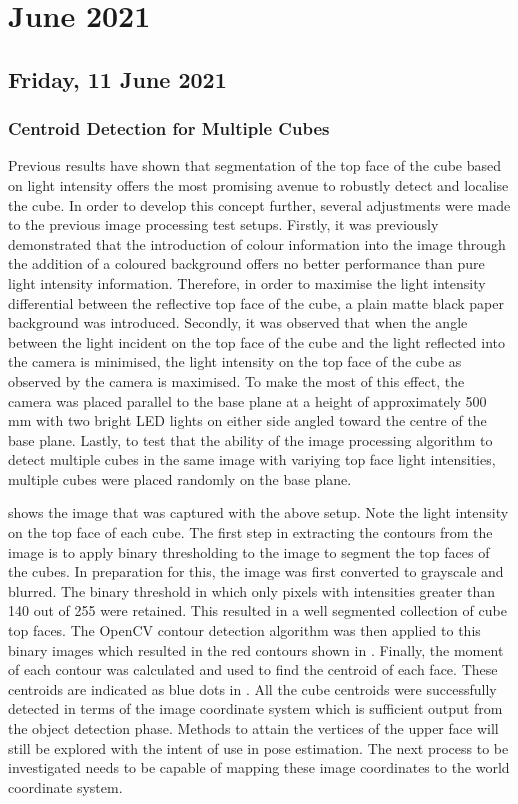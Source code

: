 \chapter[2021 June]{June 2021}

\section[2021/06/11]{Friday, 11 June 2021}

\subsection{Centroid Detection for Multiple Cubes}

Previous results have shown that segmentation of the top face of the cube based on light intensity offers the most promising avenue to robustly detect and localise the cube. In order to develop this concept further, several adjustments were made to the previous image processing test setups. Firstly, it was previously demonstrated that the introduction of colour information into the image through the addition of a coloured background offers no better performance than pure light intensity information. Therefore, in order to maximise the light intensity differential between the reflective top face of the cube, a plain matte black paper background was introduced. Secondly, it was observed that when the angle between the light incident on the top face of the cube and the light reflected into the camera is minimised, the light intensity on the top face of the cube as observed by the camera is maximised. To make the most of this effect, the camera was placed parallel to the base plane at a height of approximately 500 mm with two bright \ac{LED} lights on either side angled toward the centre of the base plane. Lastly, to test that the ability of the image processing algorithm to detect multiple cubes in the same image with variying top face light intensities, multiple cubes were placed randomly on the base plane.

 shows the image that was captured with the above setup. Note the light intensity on the top face of each cube. The first step in extracting the contours from the image is to apply binary thresholding to the image to segment the top faces of the cubes. In preparation for this, the image was first converted to grayscale and blurred. The binary threshold in which only pixels with intensities greater than 140 out of 255 were retained. This resulted in a well segmented collection of cube top faces. The OpenCV contour detection algorithm was then applied to this binary images which resulted in the red contours shown in . Finally, the moment of each contour was calculated and used to find the centroid of each face. These centroids are indicated as blue dots in . All the cube centroids were successfully detected in terms of the image coordinate system which is sufficient output from the object detection phase. Methods to attain the vertices of the upper face will still be explored with the intent of use in pose estimation. The next process to be investigated needs to be capable of mapping these image coordinates to the world coordinate system.

